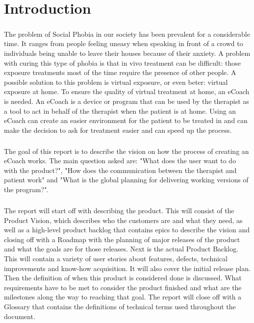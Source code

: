 \chapter{Introduction}

\paragraph{}
The problem of Social Phobia in our society has been prevalent for a considerable time. It ranges from people feeling uneasy when speaking in front of a crowd to individuals being unable to leave their houses because of their anxiety. 
A problem with curing this type of phobia is that in vivo treatment can be difficult: those exposure treatments most of the time require the presence of other people. A possible solution to this problem is virtual exposure, or even beter: virtual exposure at home. To ensure the quality of virtual treatment at home, an \gls{eCoach} is needed. An \gls{eCoach} is a device or program that can be used by the therapist as a tool to act in behalf of the therapist when the patient is at home. Using an \gls{eCoach} can create an easier environment for the patient to be treated in and can make the decision to ask for treatment easier and can speed up the process.
\paragraph{}
The goal of this report is to describe the vision on how the process of creating an \gls{eCoach} works. The main question asked are: "What does the user want to do with the product?", "How does the communication between the therapist and patient work" and "What is the global planning for delivering working versions of the program?".
\paragraph{}
The report will start off with describing the product. This will consist of the Product Vision, which describes who the customers are and what they need, as well as a high-level product backlog that contains epics to describe the vision and closing off with a Roadmap with the planning of major releases of the product and what the goals are for those releases.
Next is the actual Product Backlog. This will contain a variety of user stories about features, defects, technical improvements and know-how acquisition. It will also cover the initial release plan.
Then the definition of when this product is considered done is discussed. What requirements have to be met to consider the product finished and what are the milestones along the way to reaching that goal.
The report will close off with a Glossary that contains the definitions of technical terms used throughout the document.